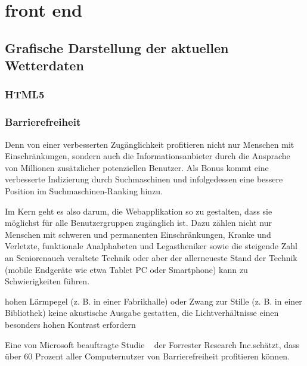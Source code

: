 \section{front end}


\subsection{Grafische Darstellung der aktuellen Wetterdaten}

\subsubsection{HTML5}

\subsubsection{Barrierefreiheit}

Denn von einer verbesserten Zugänglichkeit profitieren nicht nur Menschen mit Einschränkungen, sondern auch die Informationsanbieter durch die Ansprache von Millionen zusätzlicher potenziellen Benutzer. Als Bonus kommt eine verbesserte Indizierung durch Suchmaschinen und infolgedessen eine bessere Position im Suchmaschinen-Ranking hinzu.

Im Kern geht es also darum, die Webapplikation so zu gestalten, dass sie möglichst für alle Benutzergruppen zugänglich ist. Dazu zählen nicht nur Menschen mit schweren und permanenten Einschränkungen, Kranke und Verletzte, funktionale Analphabeten und Legastheniker sowie die steigende Zahl an Seniorenauch veraltete Technik oder aber der allerneueste Stand der Technik (mobile Endgeräte wie etwa Tablet PC oder Smartphone) kann zu Schwierigkeiten führen.

hohen Lärmpegel (z. B. in einer Fabrikhalle) oder Zwang zur Stille (z. B. in einer Bibliothek) keine akustische Ausgabe gestatten, die Lichtverhältnisse einen besonders hohen Kontrast erfordern

Eine von Microsoft beauftragte Studie ~\cite{ForresterResearch2004E:Abilities} der \flqq Forrester Research Inc.\frqq schätzt, dass über 60 Prozent aller Computernutzer von Barrierefreiheit profitieren können. 


